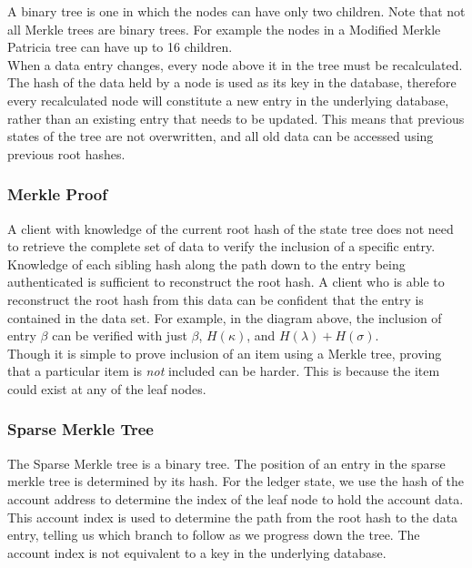 A binary tree is one in which the nodes can have only two children. Note that not all Merkle trees are binary trees. For example the nodes in a Modified Merkle Patricia tree can have up to 16 children.\\

When a data entry changes, every node above it in the tree must be recalculated. The hash of the data held by a node is used as its key in the database, therefore every recalculated node will constitute a new entry in the underlying database, rather than an existing entry that needs to be updated. This means that previous states of the tree are not overwritten, and all old data can be accessed using previous root hashes.\\

\subsubsection{Merkle Proof}

A client with knowledge of the current root hash of the state tree does not need to retrieve the complete set of data to verify the inclusion of a specific entry. Knowledge of each sibling hash along the path down to the entry being authenticated is sufficient to reconstruct the root hash. A client who is able to reconstruct the root hash from this data can be confident that the entry is contained in the data set. For example, in the diagram above, the inclusion of entry $\beta$ can be verified with just $\beta$, $H(\kappa)$, and $H(\lambda)+H(\sigma)$. \\

Though it is simple to prove inclusion of an item using a Merkle tree, proving that a particular item is \emph{not} included can be harder. This is because the item could exist at any of the leaf nodes.\\

\subsubsection{Sparse Merkle Tree}

The Sparse Merkle tree is a binary tree. The position of an entry in the sparse merkle tree is determined by its hash. For the ledger state, we use the hash of the account address to determine the index of the leaf node to hold the account data. This account index is used to determine the path from the root hash to the data entry, telling us which branch to follow as we progress down the tree. The account index is not equivalent to a key in the underlying database.\\

